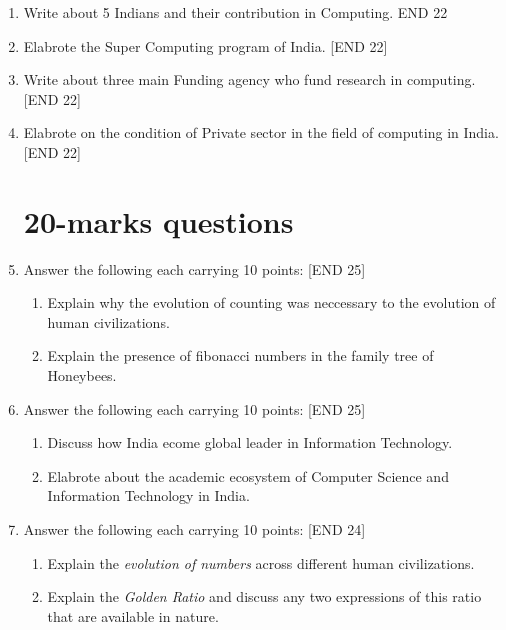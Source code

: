 \documentclass[12pt]{article}
\begin{document}
\begin{enumerate}
			\item Write about 5 Indians and their contribution in Computing. \hfill{END 22}
			
			\item Elabrote the Super Computing program of India. \hfill{[END 22]}
			
			\item Write about three main Funding agency who fund research in computing. \hfill{[END 22]}
			
			\item Elabrote on the condition of Private sector in the field of computing in India. \hfill{[END 22]}
			
			
			
			
			
			
			
			
			
			
			
			
		\section{20-marks questions}
			\item Answer the following each carrying 10 points: \hfill{[END 25]}
			\begin{enumerate}
				\item Explain why the evolution of counting was neccessary to the evolution of human civilizations.
				
				\item Explain the presence of fibonacci numbers in the family tree of Honeybees.
			\end{enumerate}
			
			\item Answer the following each carrying 10 points: \hfill{[END 25]}
			
			\begin{enumerate}
				\item Discuss how India ecome global leader in Information Technology.
				\item Elabrote about the academic ecosystem of Computer Science and Information Technology in India.
			\end{enumerate}
			
			\item Answer the following each carrying 10 points: \hfill{[END 24]}
			
			\begin{enumerate}
				\item Explain the \textit{evolution of numbers} across different human civilizations.
				\item Explain the \textit{Golden Ratio} and discuss any two expressions of this ratio that are available in nature.
			\end{enumerate}
			

\end{enumerate}
\end{document}
